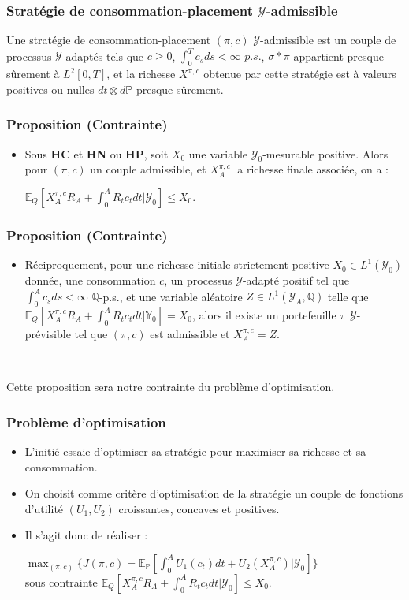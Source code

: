 \documentclass[french]{beamer}
\begin{document}
\begin{frame}
\frametitle{Stratégie de consommation-placement $\mathcal{Y}$-admissible}
Une stratégie de consommation-placement $(\pi, c)$ $\mathcal{Y}$-admissible est un couple de processus $\mathcal{Y}$-adaptés tels que $c\geq 0$, $\int_{0}^{T}c_s ds <\infty$ $p.s.$, $\sigma* \pi$ appartient presque sûrement à $L^2[0,T]$, et la richesse $X^{\pi,c}$ obtenue par cette stratégie est à valeurs positives ou nulles $dt \otimes d\mathbb{P}$-presque sûrement.
\end{frame}

\begin{frame}
\frametitle{Proposition (Contrainte)}
\begin{itemize}
\item Sous \textbf{HC} et \textbf{HN} ou \textbf{HP}, soit $X_0$ une variable $\mathcal{Y}_0$-mesurable positive. Alors pour $(\pi, c)$ un couple admissible, et $X^{\pi,c}_A$ la richesse finale associée, on a :
\begin{center}
$\mathbb{E}_Q [X^{\pi,c}_A R_A + \int_{0}^{A} R_t c_t dt | \mathcal{Y}_0] \leq X_0$.
\end{center}
\end{itemize}
\end{frame}

\begin{frame}
\frametitle{Proposition (Contrainte)}
\begin{itemize}
\item Réciproquement, pour une richesse initiale strictement positive $X_0 \in L^1(\mathcal{Y}_0)$ donnée, une consommation $c$, un processus $\mathcal{Y}$-adapté positif tel que $\int_{0}^{A} c_s ds < \infty$ $\mathbb{Q}$-p.s., et une variable aléatoire $Z \in L^1(\mathcal{Y}_A, \mathbb{Q})$ telle que $\mathbb{E}_Q [X^{\pi,c}_A R_A + \int_{0}^{A} R_t c_t dt | \mathbb{Y}_0] = X_0$, alors il existe un portefeuille $\pi$ $\mathcal{Y}$-prévisible tel que $(\pi, c)$ est admissible et $X^{\pi, c}_A = Z$.
\end{itemize}
\

Cette proposition sera notre contrainte du problème d'optimisation.
\end{frame}

\begin{frame}
\frametitle{Problème d'optimisation}
\begin{itemize}
\item L'initié essaie d'optimiser sa stratégie pour maximiser sa richesse et sa consommation.
\item On choisit comme critère d'optimisation de la stratégie un couple de fonctions d'utilité $(U_1, U_2)$ croissantes, concaves et positives. 
\item Il s'agit donc de réaliser : 
\begin{center}
$\displaystyle \max_{(\pi, c)} \{J(\pi, c) = \mathbb{E}_{\mathbb{P}}[\int_{0}^{A} U_1(c_t)dt + U_2(X^{\pi,c}_A) | \mathcal{Y}_0] \}$\\
sous contrainte $\displaystyle \mathbb{E}_Q [X^{\pi,c}_A R_A + \int_{0}^{A} R_t c_t dt | \mathcal{Y}_0] \leq X_0$.
\end{center}
\end{itemize}
\end{frame}
\end{document}
